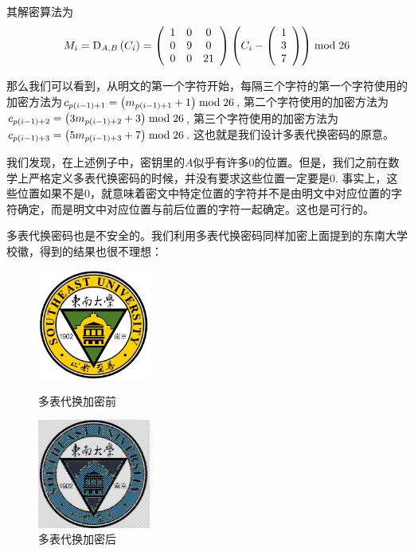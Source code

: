 其解密算法为
\[M_i={\mathrm{D}_{A, B}\left({C_i}\right)}=\left( {\begin{array}{ccc}1&0&0\\0&9&0\\0&0&21\end{array}}\right)\left( {C_i-\left( {\begin{array}{c}1\\3\\7\end{array}}\right)}\right)\bmod{26}\]

那么我们可以看到，从明文的第一个字符开始，每隔三个字符的第一个字符使用的加密方法为$c_{p(i-1)+1}=\left( {m_{p(i-1)+1}+1}\right)\bmod{26}$, 第二个字符使用的加密方法为$c_{p(i-1)+2}=\left( {3m_{p(i-1)+2}+3}\right)\bmod{26}$, 第三个字符使用的加密方法为$c_{p(i-1)+3}=\left( {5m_{p(i-1)+3}+7}\right)\bmod{26}$. 这也就是我们设计多表代换密码的原意。\par
我们发现，在上述例子中，密钥里的$A$似乎有许多$0$的位置。但是，我们之前在数学上严格定义多表代换密码的时候，并没有要求这些位置一定要是$0$. 事实上，这些位置如果不是$0$，就意味着密文中特定位置的字符并不是由明文中对应位置的字符确定，而是明文中对应位置与前后位置的字符一起确定。这也是可行的。\par
多表代换密码也是不安全的。我们利用多表代换密码同样加密上面提到的东南大学校徽，得到的结果也很不理想：
\begin{figure}[H]
\centering
\begin{minipage}[t]{0.49\textwidth}
\centering
\includegraphics[width=10em]{chapters/chapter_1/Caesar_origin.jpg}
\caption{多表代换加密前}
\end{minipage}
\begin{minipage}[t]{0.49\textwidth}
\centering
\includegraphics[width=10em]{chapters/chapter_1/Multi_result.jpg}
\caption{多表代换加密后}
\end{minipage}
\end{figure}
